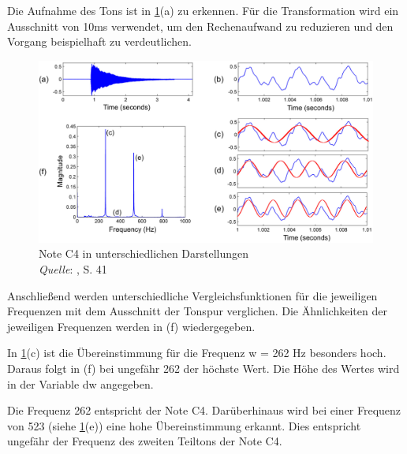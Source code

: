
Die Aufnahme des Tons ist in \cref{fig:fourier}(a) zu erkennen. Für die Transformation wird ein Ausschnitt von 10ms verwendet, um den Rechenaufwand zu reduzieren und den Vorgang beispielhaft zu verdeutlichen.

%
\begin{figure}[h]
    \includegraphics[width=1\textwidth]{images/Fourier_math.PNG}
    \caption{Note C4 in unterschiedlichen Darstellungen\\\hspace{\textwidth}\textit{Quelle}: \cite{fundamentals_of_music_processing}, S. 41}
    \label{fig:fourier}
\end{figure}
%

Anschließend werden unterschiedliche Vergleichsfunktionen für die jeweiligen Frequenzen mit dem Ausschnitt der Tonspur verglichen. Die Ähnlichkeiten der jeweiligen Frequenzen werden in (f) wiedergegeben.

\par

In \cref{fig:fourier}(c) ist die Übereinstimmung für die Frequenz w = 262 Hz besonders hoch. Daraus folgt in (f) bei ungefähr 262 der höchste Wert. Die Höhe des Wertes wird in der Variable dw angegeben.


\par

Die Frequenz 262 entspricht der Note C4. Darüberhinaus wird bei einer Frequenz von 523 (siehe \cref{fig:fourier}(e)) eine hohe Übereinstimmung erkannt. Dies entspricht ungefähr der Frequenz des zweiten Teiltons der Note C4.

